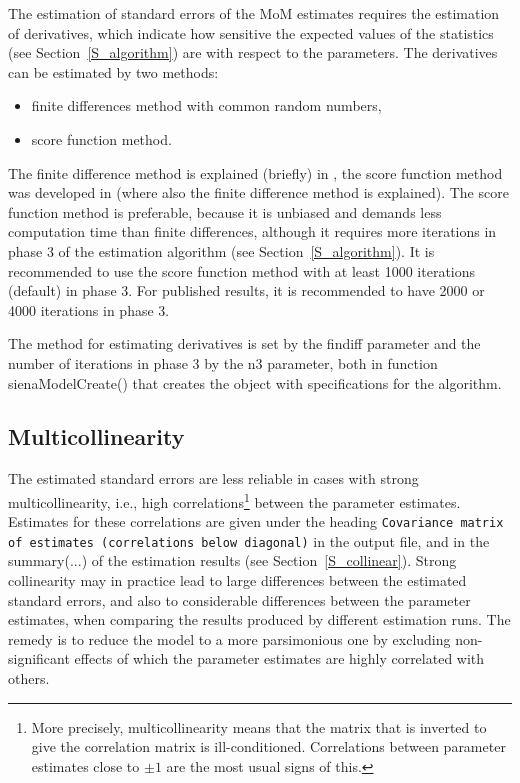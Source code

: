 \documentclass[a4paper,fleqn,11pt]{article}
\newcommand{\+}{\, + \,}
\newcommand{\sfn}[1]{\textsf{#1}}
\begin{document}
The estimation of standard errors of the MoM estimates requires
the estimation of derivatives,
which indicate how sensitive the expected values of the statistics
(see Section~\ref{S_algorithm}) are with respect to the parameters.
The derivatives can be estimated by two methods:
\begin{itemize}
\item finite differences method with common random numbers,
\item score function method.
\end{itemize}
The finite difference method is explained (briefly) in \citet{Snijders01},
the score function method was developed in \citet{SchweinbergerSnijders07a}
(where also the finite difference method is explained).
The score function method is preferable, because it is unbiased
and demands less computation time than finite differences,
although it requires more iterations in phase 3 of the estimation algorithm
(see Section~\ref{S_algorithm}).
It is recommended to use the score function method with
at least 1000 iterations (default) in phase 3.  For
published results, it is recommended to have 2000 or 4000 iterations in phase 3.

The method for estimating derivatives is set
by the \sfn{findiff} parameter and the number of iterations in phase 3
by the \sfn{n3} parameter, both in function \sfn{sienaModelCreate()}
that creates the object with specifications for the algorithm.

\subsection{Multicollinearity}

The estimated standard errors are less reliable in
cases with strong multicollinearity, i.e., high correlations\footnote{More
precisely, multicollinearity means that the matrix that is inverted
to give the correlation matrix is ill-conditioned.
Correlations between parameter estimates
close to $\pm 1$ are the most usual signs of this.} between
the parameter estimates. Estimates for these correlations
are given under the heading
\texttt{Covariance matrix of estimates (correlations below diagonal)}
in the output file, and in the \textsf{summary(...)} of the estimation results
(see Section~\ref{S_collinear}).
Strong collinearity may in practice lead to large differences
between the estimated standard errors,
and also to considerable differences between the parameter estimates,
when comparing the results produced by different estimation runs.
The remedy is to reduce the model to a more parsimonious one
by excluding non-significant effects of which the parameter
estimates are highly correlated with others.
\end{document}
